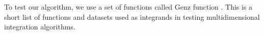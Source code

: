 To test our algorithm, we use a set of functions called Genz function \cite{Genz}. This is a short list of functions and datasets used as integrands in testing multidimensional integration algorithms. 